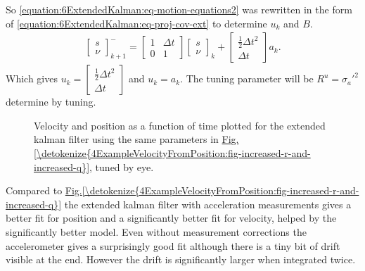 \documentclass[letterpaper,10pt,english]{jupyterBook}
\begin{document}
\sphinxAtStartPar
So \eqref{equation:6ExtendedKalman:eq-motion-equations2} was rewritten in the form of \eqref{equation:6ExtendedKalman:eq-proj-cov-ext} to determine \(u_k\) and \(B\).
\begin{equation*}
\begin{split}\begin{bmatrix} s \\ \nu \end{bmatrix}^-_{k+1} = \begin{bmatrix} 1 & \Delta t \\ 0 & 1 \end{bmatrix} \begin{bmatrix} s \\ \nu \end{bmatrix}_k + \begin{bmatrix} \frac{1}{2} \Delta t^2 \\ \Delta t \end{bmatrix} a_k.\end{split}
\end{equation*}
\sphinxAtStartPar
Which gives \(u_k = \begin{bmatrix} \frac{1}{2} \Delta t^2 \\ \Delta t \end{bmatrix}\) and \(u_k = a_k\). The tuning parameter will be \(R^u = \sigma_a'^2\) determine by tuning.

\begin{figure}[htbp]
\centering
\capstart

\noindent{}
\caption{Velocity and position as a function of time plotted for the extended kalman filter using the same parameters in \hyperref[\detokenize{4ExampleVelocityFromPosition:fig-increased-r-and-increased-q}]{Fig.\@ \ref{\detokenize{4ExampleVelocityFromPosition:fig-increased-r-and-increased-q}}}, tuned by eye. }\label{\detokenize{6ExtendedKalman:fig-improved-vel-pos}}\end{figure}

\sphinxAtStartPar
Compared to \hyperref[\detokenize{4ExampleVelocityFromPosition:fig-increased-r-and-increased-q}]{Fig.\@ \ref{\detokenize{4ExampleVelocityFromPosition:fig-increased-r-and-increased-q}}} the extended kalman filter with acceleration measurements gives a better fit for position and a significantly better fit for velocity, helped by the significantly better model. Even without measurement corrections the accelerometer gives a surprisingly good fit although there is a tiny bit of drift visible at the end. However the drift is significantly larger when integrated twice.
\end{document}

